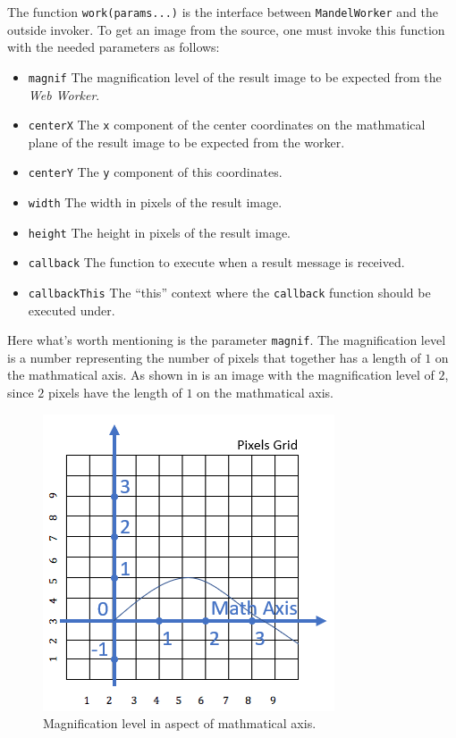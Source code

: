The function \texttt{work(params...)} is the interface between \texttt{MandelWorker} and the outside invoker. To get an image from the source, one must invoke this function with the needed parameters as follows:

\begin{itemize}
  \item \texttt{magnif} The magnification level of the result image to be expected from the \emph{Web Worker}.
  \item \texttt{centerX} The \texttt{x} component of the center coordinates on the mathmatical plane of the result image to be expected from the worker.
  \item \texttt{centerY} The \texttt{y} component of this coordinates.
  \item \texttt{width} The width in pixels of the result image.
  \item \texttt{height} The height in pixels of the result image.
  \item \texttt{callback} The function to execute when a result message is received.
  \item \texttt{callbackThis} The ``this'' context where the \texttt{callback} function should be executed under.
\end{itemize}

Here what's worth mentioning is the parameter \texttt{magnif}. The magnification level is a number representing the number of pixels that together has a length of $1$ on the mathmatical axis. As shown in  is an image with the magnification level of $2$, since $2$ pixels have the length of $1$ on the mathmatical axis.

\begin{figure}[th]
\centering
\includegraphics[keepaspectratio]{Figures/Chapter4/magnif.png}
\decoRule
\caption[Magnification Level]{Magnification level in aspect of mathmatical axis.}
\label{fig:magnif}
\end{figure}


